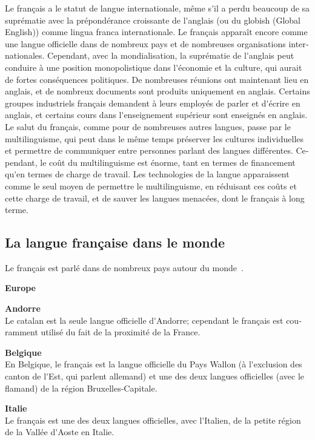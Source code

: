 \begin{french}
\begin{multicols}{2}
Le français a le statut de langue internationale, même s{\mbox '}il a
perdu beaucoup de sa suprématie avec la prépondérance croissante de
l{\mbox '}anglais (ou du globish (Global English)) comme lingua franca
internationale. Le français apparaît encore comme une langue
officielle dans de nombreux pays et de nombreuses organisations
internationales. Cependant, avec la mondialisation, la suprématie de
l{\mbox '}anglais peut conduire à une position monopolistique dans
l{\mbox '}économie et la culture, qui aurait de fortes conséquences
politiques. De nombreuses réunions ont maintenant lieu en anglais, et
de nombreux documents sont produits uniquement en anglais. Certains
groupes industriels français demandent à leurs employés de parler 
et d{\mbox '}écrire en anglais, et certains cours dans l{\mbox
  '}enseignement supérieur sont enseignés en anglais. Le salut du
français, comme pour de nombreuses autres langues, passe par le
multilinguisme, qui peut dans le même temps préserver les cultures
individuelles et permettre de communiquer entre personnes parlant
des langues différentes. Cependant, le coût du multilinguisme est
énorme, tant en termes de financement qu{\mbox '}en termes de charge
de travail. Les technologies de la langue apparaissent comme le seul
moyen de permettre le multilinguisme, en réduisant ces coûts et cette 
charge de travail, et de sauver les langues menacées, dont le français
à long terme.

\subsection{La langue française dans le monde}
\label{frenchInTheWorld}
Le français est parlé dans de nombreux pays autour du
monde~\cite{francaisautourmonde}.

\begin{center}
{\bf {\sc Europe}}
\end{center}

{\bf Andorre}\\
Le catalan est la seule langue officielle d{\mbox '}Andorre; cependant
le français est couramment utilisé du fait de la proximité de la
France.

{\bf Belgique}\\
En Belgique, le français est la langue officielle du Pays Wallon (à
l{\mbox '}exclusion des canton de l{\mbox '}Est, qui parlent allemand)
et une des deux langues officielles (avec le flamand) de la région
Bruxelles-Capitale.

{\bf Italie}\\
Le français est une des deux langues officielles, avec l{\mbox
 '}Italien, de la petite région de la Vallée d{\mbox '}Aoste en
Italie.


\end{multicols}
\end{french}
